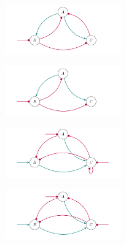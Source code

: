 \documentclass[varwidth=18cm, border=10pt]{standalone}
\begin{document}
\begin{figure}
\begin{subfigure}{6cm}
\caption{}
\end{subfigure}
\begin{subfigure}{6cm}
\centering\includegraphics[width=5cm]{ommoppoompmoo.pdf}
\caption{}
\end{subfigure}
\begin{subfigure}{6cm}
\centering\includegraphics[width=5cm]{omooppoompmoo.pdf}
\caption{}
\end{subfigure}
\begin{subfigure}{6cm}
\centering\includegraphics[width=5cm]{oommpmompppmm.pdf}
\caption{}
\end{subfigure}
\begin{subfigure}{6cm}
\centering\includegraphics[width=5cm]{oommpmompppom.pdf}
\caption{}
\end{subfigure}
\end{figure}
\end{document}
